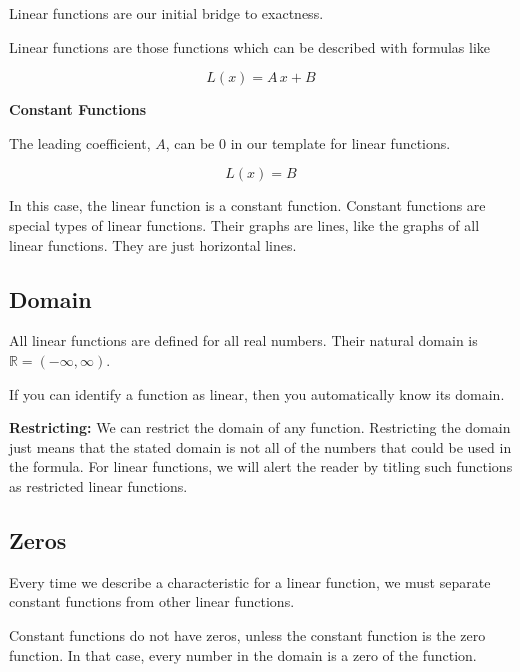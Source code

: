 \documentclass{ximera}
\begin{document}
Linear functions are our initial bridge to exactness. 


Linear functions are those functions which can be described with formulas like

\[
L(x) = A \, x + B 
\]



\begin{warning} \textbf{\textcolor{red!70!black}{Constant Functions}}

The leading coefficient, $A$, can be $0$ in our template for linear functions. 

\[
L(x) = B 
\]

In this case, the linear function is a constant function.  Constant functions are special types of linear functions. Their graphs are lines, like the graphs of all linear functions.  They are just horizontal lines.

\end{warning}




\subsection*{Domain} 

All linear functions are defined for all real numbers.  Their natural domain is $\mathbb{R} = (-\infty, \infty)$. 

If you can identify a function as linear, then you automatically know its domain. 


\textbf{Restricting:}  We can restrict the domain of any function.  Restricting the domain just means that the stated domain is not all of the numbers that could be used in the formula.  For linear functions, we will alert the reader by titling such functions as restricted linear functions.







\subsection*{Zeros}

Every time we describe a characteristic for a linear function, we must separate constant functions from other linear functions. 

Constant functions do not have zeros, unless the constant function is the zero function.  In that case, every number in the domain is a zero of the function. 
\end{document}
